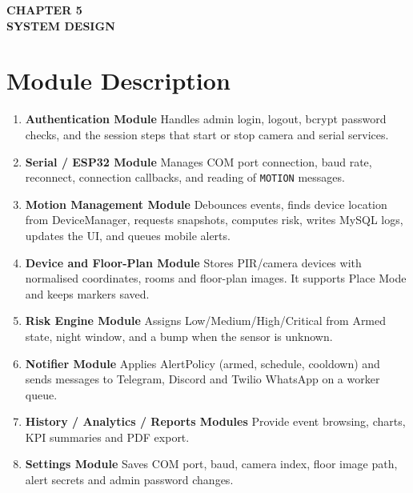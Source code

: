 \documentclass[12pt,a4paper]{report}
\begin{document}


\cleardoublepage
\thispagestyle{empty}

\null
\vfill

\begin{center}
    {\fontsize{16pt}{18pt}\selectfont\bfseries
    CHAPTER 5}\\[0.5cm]

    {\fontsize{16pt}{18pt}\selectfont\bfseries
    SYSTEM DESIGN}
\end{center}

\vfill
\null

\clearpage

\section{Module Description}

\begin{enumerate}

\item \textbf{Authentication Module}
Handles admin login, logout, bcrypt password checks, and the session steps that start or stop camera and serial services.

\item \textbf{Serial / ESP32 Module}
Manages COM port connection, baud rate, reconnect, connection callbacks, and reading of \texttt{MOTION} messages.

\item \textbf{Motion Management Module}
Debounces events, finds device location from DeviceManager, requests snapshots, computes risk, writes MySQL logs, updates the UI, and queues mobile alerts.

\item \textbf{Device and Floor-Plan Module}
Stores PIR/camera devices with normalised coordinates, rooms and floor-plan images. It supports Place Mode and keeps markers saved.

\item \textbf{Risk Engine Module}
Assigns Low/Medium/High/Critical from Armed state, night window, and a bump when the sensor is unknown.

\item \textbf{Notifier Module}
Applies AlertPolicy (armed, schedule, cooldown) and sends messages to Telegram, Discord and Twilio WhatsApp on a worker queue.

\item \textbf{History / Analytics / Reports Modules}
Provide event browsing, charts, KPI summaries and PDF export.

\item \textbf{Settings Module}
Saves COM port, baud, camera index, floor image path, alert secrets and admin password changes.

\end{enumerate}
\end{document}
